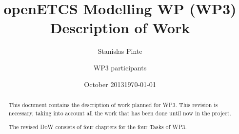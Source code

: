 \documentclass{template/openetcs_article}
\begin{document}
\frontmatter
{}




\title{openETCS Modelling WP (WP3) Description of Work}


\date{October 2013}
\date{\today}


\author{Stanislas Pinte}


\author{WP3 participants}

    


\begin{abstract}
This document contains the description of work planned for WP3.  This revision is necessary, taking into account all the work that has been done until now in the project.  

The revised DoW consists of four chapters for the four Tasks of WP3.

\end{abstract}

\maketitle
\tableofcontents
\newpage





\setlength{\marginparwidth}{1in}
\let\oldmarginpar\marginpar
\renewcommand\marginpar[1]{\-\oldmarginpar[\raggedleft\scriptsize #1]%
{\raggedright\scriptsize #1}}

\newcommand{\oldtext}[1]{{Old: \scriptsize #1}}
\end{document}
